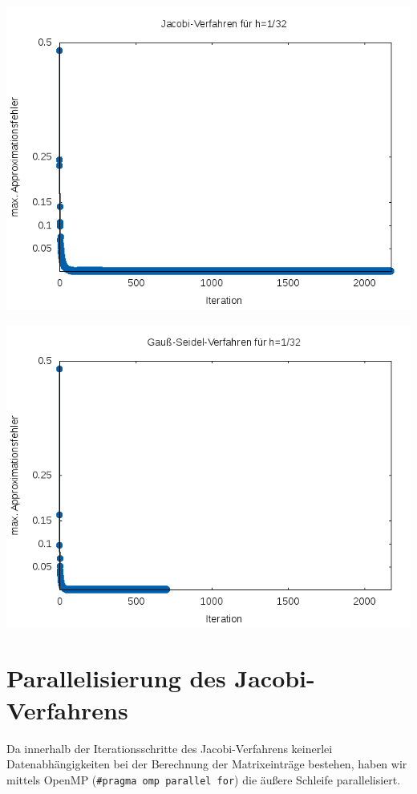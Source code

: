 \documentclass{article}
\begin{document}
\begin{center}
\includegraphics[scale=0.8]{bilder/fehler_jacobi_1_32.png}
\end{center}

\begin{center}
\includegraphics[scale=0.8]{bilder/fehler_gs_1_32.png}
\end{center}

\section{Parallelisierung des Jacobi-Verfahrens} \label{parallel:jacobi}

Da innerhalb der Iterationsschritte des Jacobi-Verfahrens keinerlei Datenabhängigkeiten bei der Berechnung der Matrixeinträge bestehen, haben wir mittels OpenMP (\texttt{\#pragma omp parallel for}) die äußere Schleife parallelisiert.
\end{document}
